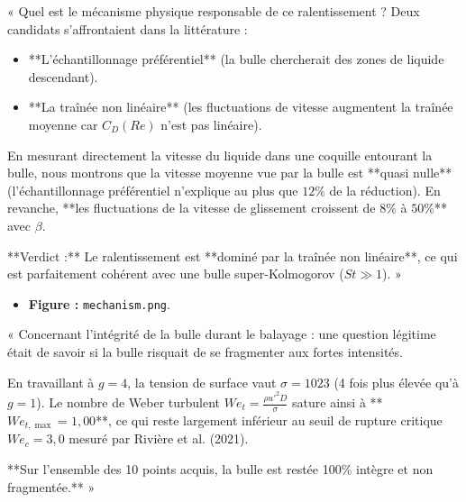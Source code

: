 \documentclass[11pt,a4paper]{article}
\begin{document}
\begin{tcolorbox}[slidebox,title=Diapositive 6 : Identification du Mécanisme Physique]
\begin{tcolorbox}[keybox,title=Ce qu'il faut dire à l'oral :]
« Quel est le mécanisme physique responsable de ce ralentissement ? Deux candidats s'affrontaient dans la littérature :
\begin{itemize}
    \item **L'échantillonnage préférentiel** (la bulle chercherait des zones de liquide descendant).
    \item **La traînée non linéaire** (les fluctuations de vitesse augmentent la traînée moyenne car $C_D(Re)$ n'est pas linéaire).
\end{itemize}

En mesurant directement la vitesse du liquide dans une coquille entourant la bulle, nous montrons que la vitesse moyenne vue par la bulle est **quasi nulle** (l'échantillonnage préférentiel n'explique au plus que $12\%$ de la réduction). En revanche, **les fluctuations de la vitesse de glissement croissent de $8\%$ à $50\%$** avec $\beta$.

**Verdict :** Le ralentissement est **dominé par la traînée non linéaire**, ce qui est parfaitement cohérent avec une bulle super-Kolmogorov ($St \gg 1$). »
\end{tcolorbox}

\begin{itemize}
    \item \textbf{Figure :} \texttt{mechanism.png}.
\end{itemize}
\end{tcolorbox}

\begin{tcolorbox}[slidebox,title=Diapositive 7 : Couverture de la Campagne et Intégrité de la Bulle]
\begin{tcolorbox}[keybox,title=Ce qu'il faut dire à l'oral :]
« Concernant l'intégrité de la bulle durant le balayage : une question légitime était de savoir si la bulle risquait de se fragmenter aux fortes intensités.

En travaillant à $g=4$, la tension de surface vaut $\sigma = 1023$ (4 fois plus élevée qu'à $g=1$). Le nombre de Weber turbulent $We_t = \frac{\rho u'^2 D}{\sigma}$ sature ainsi à **$We_{t,\max} = 1{,}00$**, ce qui reste largement inférieur au seuil de rupture critique $We_c = 3{,}0$ mesuré par Rivière et al. (2021).

**Sur l'ensemble des 10 points acquis, la bulle est restée 100\% intègre et non fragmentée.** »
\end{tcolorbox}
\end{tcolorbox}
\end{document}
